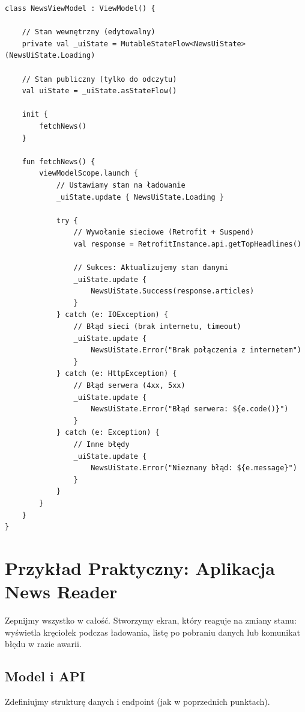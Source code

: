 \begin{verbatim}
class NewsViewModel : ViewModel() {

    // Stan wewnętrzny (edytowalny)
    private val _uiState = MutableStateFlow<NewsUiState>(NewsUiState.Loading)
    
    // Stan publiczny (tylko do odczytu)
    val uiState = _uiState.asStateFlow()

    init {
        fetchNews()
    }

    fun fetchNews() {
        viewModelScope.launch {
            // Ustawiamy stan na ładowanie
            _uiState.update { NewsUiState.Loading }
            
            try {
                // Wywołanie sieciowe (Retrofit + Suspend)
                val response = RetrofitInstance.api.getTopHeadlines()
                
                // Sukces: Aktualizujemy stan danymi
                _uiState.update { 
                    NewsUiState.Success(response.articles) 
                }
            } catch (e: IOException) {
                // Błąd sieci (brak internetu, timeout)
                _uiState.update { 
                    NewsUiState.Error("Brak połączenia z internetem") 
                }
            } catch (e: HttpException) {
                // Błąd serwera (4xx, 5xx)
                _uiState.update { 
                    NewsUiState.Error("Błąd serwera: ${e.code()}") 
                }
            } catch (e: Exception) {
                // Inne błędy
                _uiState.update { 
                    NewsUiState.Error("Nieznany błąd: ${e.message}") 
                }
            }
        }
    }
}
\end{verbatim}

\section{Przykład Praktyczny: Aplikacja News Reader}

Zepnijmy wszystko w całość. Stworzymy ekran, który reaguje na zmiany stanu: wyświetla kręciołek podczas ładowania, listę po pobraniu danych lub komunikat błędu w razie awarii.

\subsection{Model i API}

Zdefiniujmy strukturę danych i endpoint (jak w poprzednich punktach).

